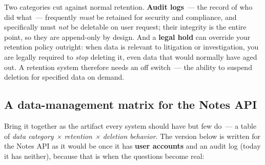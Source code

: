 Two categories cut against normal retention. \textbf{Audit logs}~--- the record of who did what~--- frequently \emph{must} be retained for security and compliance, and specifically must \emph{not} be deletable on user request; their integrity is the entire point, so they are append-only by design. And a \textbf{legal hold} can override your retention policy outright: when data is relevant to litigation or investigation, you are legally required to \emph{stop} deleting it, even data that would normally have aged out. A retention system therefore needs an off switch~--- the ability to suspend deletion for specified data on demand.

\subsection*{A data-management matrix for the Notes API}\label{37-reliability:a-data-management-matrix-for-the-notes-api}

Bring it together as the artifact every system should have but few do~--- a table of \emph{data category × retention × deletion behavior}. The version below is written for the Notes API as it would be once it has \textbf{user accounts} and an audit log (today it has neither), because that is when the questions become real:


